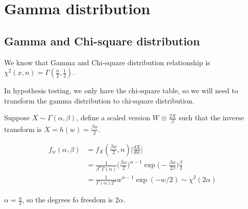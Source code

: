 \section{Gamma distribution}

\subsection{Gamma and Chi-square distribution}

We know that Gamma and Chi-square distribution relationship is $\chi^2(x, n) = \Gamma(\frac{n}{2}, \frac{1}{2})$.

In hypothesis testing, we only have the chi-square table, so we will need to transform the gamma distribution to chi-square distribution. 

Suppose $X \sim \Gamma(\alpha, \beta)$, define a scaled version $W \equiv \frac{2X}{\beta}$ such that the inverse transform is $X = h(w) = \frac{\beta w}{2}$.

\begin{align*}
f_{w}(\alpha, \beta) &= f_{X}(\frac{\beta w}{2}, n) \Big | \frac{d X}{d w}\Big | \\
&= \frac{1}{\beta^{\alpha} \Gamma(\alpha)} \Big( \frac{\beta w}{2}\Big)^{\alpha-1} \exp \Big( -\frac{\beta w}{2 \beta} \Big) \frac{\beta }{2}\\
&= \frac{1}{\Gamma(\alpha) 2^{\alpha}} w^{\alpha -1} \exp(-w/2) \sim \chi^2(2 \alpha)
\end{align*}

$\alpha = \frac{n}{2}$, so the degrees fo freedom is $2 \alpha$. 